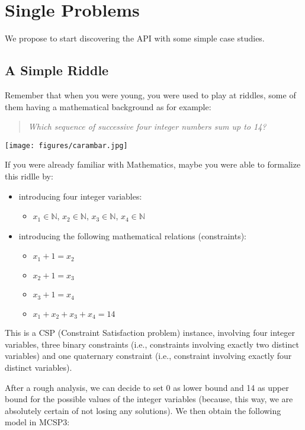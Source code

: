 \documentclass[10pt]{article}
\def\N{\mathbb{N}}
\def\mt{{\rm MCSP3}\xspace}
\begin{document}
\section{Single Problems}

We propose to start discovering the API with some simple case studies.

\subsection{A Simple Riddle}

Remember that when you were young, you were used to play at riddles, some of them having a mathematical background as for example:
\begin{quote}
{\em Which sequence of successive four integer numbers sum up to 14?}
\end{quote}

\begin{center}
  \texttt{[image: figures/carambar.jpg]}
\end{center}

If you were already familiar with Mathematics, maybe you were able to formalize this ridlle by:
\begin{itemize}
\item introducing four integer variables:
\begin{itemize}
  \item $x_1 \in \N$, $x_2 \in \N$, $x_3 \in \N$, $x_4 \in \N$
\end{itemize}
\item introducing the following mathematical relations (constraints):
\begin{itemize}
\item $x_1+1 = x_2$
\item $x_2+1 = x_3$
\item  $x_3+1=x_4$
\item $x_1 + x_2 + x_3 + x_4 = 14$
\end{itemize}
\end{itemize}

This is a CSP (Constraint Satisfaction problem) instance, involving four integer variables, three binary constraints (i.e., constraints involving exactly two distinct variables) and one quaternary constraint (i.e., constraint involving exactly four distinct variables).

After a rough analysis, we can decide to set 0 as lower bound and 14 as upper bound for the possible values of the integer variables (because, this way, we are absolutely certain of not losing any solutions).
We then obtain the following model in \mt:
\end{document}
